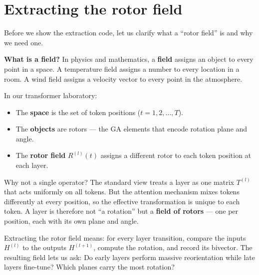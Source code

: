 \documentclass[11pt, twoside, openright]{memoir}
\numberwithin{equation}{chapter}
\begin{document}
\section{Extracting the rotor field}
\label{sec:extracting-rotor}

Before we show the extraction code, let us clarify what a ``rotor
field'' is and why we need one.

\begin{keyidea}
\textbf{What is a field?}
In physics and mathematics, a \textbf{field} assigns an object to
every point in a space.  A temperature field assigns a number to every
location in a room.  A wind field assigns a velocity vector to every
point in the atmosphere.

In our transformer laboratory:
\begin{itemize}[nosep]
\item The \textbf{space} is the set of token positions
  ($t = 1, 2, \ldots, T$).
\item The \textbf{objects} are rotors --- the GA elements that encode
  rotation plane and angle.
\item The \textbf{rotor field} $R^{(l)}(t)$ assigns a different rotor
  to each token position at each layer.
\end{itemize}

Why not a single operator?  The standard view treats a layer as one
matrix $T^{(l)}$ that acts uniformly on all tokens.  But the attention
mechanism mixes tokens differently at every position, so the effective
transformation is unique to each token.  A layer is therefore not ``a
rotation'' but a \textbf{field of rotors} --- one per position, each
with its own plane and angle.

Extracting the rotor field means: for every layer transition,
compare the inputs $H^{(l)}$ to the outputs $H^{(l+1)}$, compute
the rotation, and record its bivector.  The resulting field lets
us ask: Do early layers perform massive reorientation while late
layers fine-tune?  Which planes carry the most rotation?
\end{keyidea}
\end{document}
